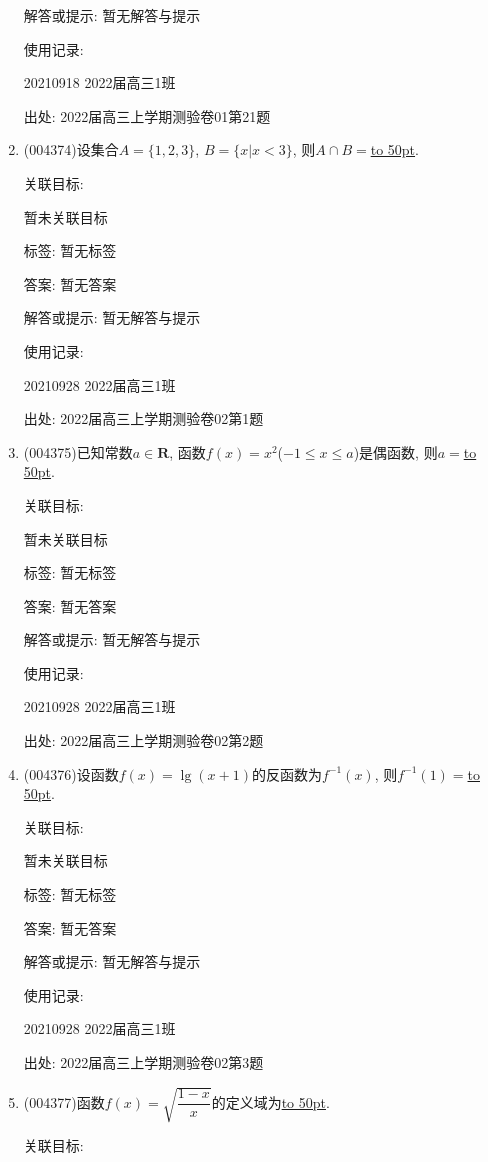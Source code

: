 \documentclass[10pt,a4paper]{article}
\newcommand{\blank}[1]{\underline{\hbox to #1pt{}}}
\begin{document}
\begin{enumerate}[1.]
解答或提示: 暂无解答与提示

使用记录:

20210918	2022届高三1班			


出处: 2022届高三上学期测验卷01第21题
\item { (004374)}设集合$A=\{1,2,3\}$, $B=\{x|x<3\}$, 则$A\cap B=$\blank{50}.


关联目标:

暂未关联目标



标签: 暂无标签

答案: 暂无答案

解答或提示: 暂无解答与提示

使用记录:

20210928	2022届高三1班	


出处: 2022届高三上学期测验卷02第1题
\item { (004375)}已知常数$a\in \mathbf{R}$, 函数$f(x)=x^2$($-1\le x\le a$)是偶函数, 则$a=$\blank{50}.


关联目标:

暂未关联目标



标签: 暂无标签

答案: 暂无答案

解答或提示: 暂无解答与提示

使用记录:

20210928	2022届高三1班	


出处: 2022届高三上学期测验卷02第2题
\item { (004376)}设函数$f(x)=\lg (x+1)$的反函数为$f^{-1}(x)$, 则$f^{-1}(1)=$\blank{50}.


关联目标:

暂未关联目标



标签: 暂无标签

答案: 暂无答案

解答或提示: 暂无解答与提示

使用记录:

20210928	2022届高三1班	


出处: 2022届高三上学期测验卷02第3题
\item { (004377)}函数$f(x)=\sqrt{\dfrac{1-x}x}$的定义域为\blank{50}.


关联目标:


\end{enumerate}
\end{document}

